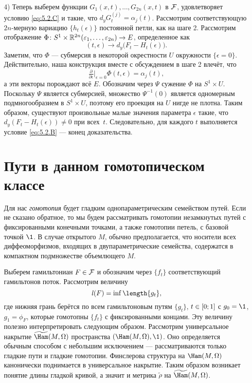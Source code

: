 4) Теперь выберем функции $G_1(x,t),\dots, G_{2n}(x,t)$ в $\mathcal{F}$, удовлетворяет условию \ref{eq:5.2.C} и такие, что $d_y G_t^{(j)} = \alpha_j (t)$.
Рассмотрим соответствующую $2n$-мерную вариацию $\{h_t (\epsilon)\}$ постоянной петли, как на шаге 2.
Рассмотрим отображение $\Phi\colon S^1 \times \mathbb{R}^{2n} (\varepsilon_1 ,\dots, \varepsilon_{2n}) \to E$, определенное как 
\[(t, \epsilon) \to d_y \big(F_t - H_t (\epsilon)\big).\]
Заметим, что $\Phi$ — субмерсия в некоторой окрестности $U$ окружности $\{\epsilon = 0\}$.
Действительно, наша конструкция вместе с обсуждением в шаге 2 влечёт, что 
\[\tfrac{\partial}{\partial\epsilon}|_{\epsilon = 0} \Phi (t, \epsilon) = \alpha_j (t),\]
а эти векторы порождают всё $E$.
Обозначим через $\Psi$ сужение $\Phi$ на $S^1 \times U$.
Поскольку $\Psi$ является субмерсией, множество $\Psi^{-1} (0)$ является одномерным подмногообразием в $S^1 \times U$, поэтому его проекция на $U$ нигде не плотна.
Таким образом, существуют произвольные малые значения параметра $\epsilon$ такие, что $d_y (F_t - H_t (\epsilon)) \ne 0$ при всех~$t$.
Следовательно, для каждого $t$ выполняется условие \ref{eq:5.2.B} — конец доказательства.
\qeds

\section{Пути в данном гомотопическом классе}\label{5.3}

Для нас \emph{гомотопия} будет гладким однопараметрическим семейством путей.
Если не сказано обратное, то мы будем рассматривать гомотопии незамкнутых путей с фиксированными конечными точками, а также гомотопии петель, с базовой точкой $\1$.
В случае открытого $M$, обычно предполагается, что носители всех диффеоморфизмов, входящих в двупараметрические семейства, содержатся в компактном подмножестве объемлющего $M$.

Выберем гамильтониан $F \in \mathcal{F}$ и обозначим через $\{f_t\}$ соответствующий гамильтонов поток.
Рассмотрим величину 
\[\l(F) = \inf \length \{g_t\},\]
где нижняя грань берётся по всем гамильтоновым путям $\{g_t\}$, $t
\z\in [0; 1]$ с $g_0 = \1$, $g_1 = \phi_F$, которые гомотопны
$\{f_t\}$ с фиксированными концами. 
Эту величину полезно интерпретировать следующим образом.
Рассмотрим универсальное накрытие $\widetilde\Ham(M, \Omega)$
пространства $(\Ham (M, \Omega), \1)$. 
Оно определяется обычным способом с небольшим исключением —
рассматриваются только гладкие пути и гладкие гомотопии. 
Финслерова структура на $\Ham (M, \Omega)$ канонически поднимается в
универсальное накрытие. 
Таким образом возникает понятие длины гладкой кривой, а значит и
метрика $\tilde\rho$ на  $\widetilde\Ham(M, \Omega)$. 

